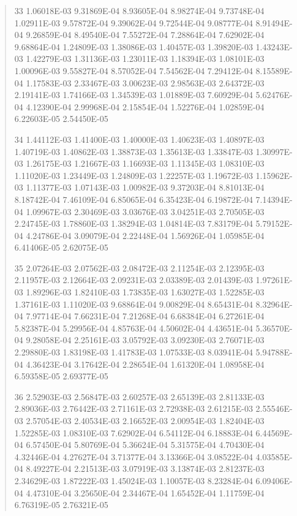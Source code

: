 \documentclass[letterpaper,10pt,english]{sphinxmanual}
\begin{document}
\begin{quote}
\begin{DUlineblock}{0em}
\item[] 33   1.06018E-03  9.31869E-04  8.93605E-04  8.98274E-04  9.73748E-04  1.02911E-03  9.57872E-04  9.39062E-04  9.72544E-04  9.08777E-04  8.91494E-04  9.26859E-04  8.49540E-04  7.55272E-04  7.28864E-04  7.62902E-04  9.68864E-04  1.24809E-03  1.38086E-03  1.40457E-03  1.39820E-03  1.43243E-03  1.42279E-03  1.31136E-03  1.23011E-03  1.18394E-03  1.08101E-03  1.00096E-03  9.55827E-04  8.57052E-04  7.54562E-04  7.29412E-04  8.15589E-04  1.17583E-03  2.33467E-03  3.00623E-03  2.98563E-03  2.64372E-03  2.19141E-03  1.74166E-03  1.34539E-03  1.01889E-03  7.60929E-04  5.62476E-04  4.12390E-04  2.99968E-04  2.15854E-04  1.52276E-04  1.02859E-04  6.22603E-05  2.54450E-05
\item[] 34   1.44112E-03  1.41400E-03  1.40000E-03  1.40623E-03  1.40897E-03  1.40719E-03  1.40862E-03  1.38873E-03  1.35613E-03  1.33847E-03  1.30997E-03  1.26175E-03  1.21667E-03  1.16693E-03  1.11345E-03  1.08310E-03  1.11020E-03  1.23449E-03  1.24809E-03  1.22257E-03  1.19672E-03  1.15962E-03  1.11377E-03  1.07143E-03  1.00982E-03  9.37203E-04  8.81013E-04  8.18742E-04  7.46109E-04  6.85065E-04  6.35423E-04  6.19872E-04  7.14394E-04  1.09967E-03  2.30469E-03  3.03676E-03  3.04251E-03  2.70505E-03  2.24745E-03  1.78860E-03  1.38294E-03  1.04814E-03  7.83179E-04  5.79152E-04  4.24786E-04  3.09079E-04  2.22448E-04  1.56926E-04  1.05985E-04  6.41406E-05  2.62075E-05
\item[] 35   2.07264E-03  2.07562E-03  2.08472E-03  2.11254E-03  2.12395E-03  2.11957E-03  2.12664E-03  2.09231E-03  2.03389E-03  2.01439E-03  1.97261E-03  1.89296E-03  1.82410E-03  1.73835E-03  1.63027E-03  1.52285E-03  1.37161E-03  1.11020E-03  9.68864E-04  9.00829E-04  8.65431E-04  8.32964E-04  7.97714E-04  7.66231E-04  7.21268E-04  6.68384E-04  6.27261E-04  5.82387E-04  5.29956E-04  4.85763E-04  4.50602E-04  4.43651E-04  5.36570E-04  9.28058E-04  2.25161E-03  3.05792E-03  3.09230E-03  2.76071E-03  2.29880E-03  1.83198E-03  1.41783E-03  1.07533E-03  8.03941E-04  5.94788E-04  4.36423E-04  3.17642E-04  2.28654E-04  1.61320E-04  1.08958E-04  6.59358E-05  2.69377E-05
\item[] 36   2.52903E-03  2.56847E-03  2.60257E-03  2.65139E-03  2.81133E-03  2.89036E-03  2.76442E-03  2.71161E-03  2.72938E-03  2.61215E-03  2.55546E-03  2.57054E-03  2.40534E-03  2.16652E-03  2.00954E-03  1.82404E-03  1.52285E-03  1.08310E-03  7.62902E-04  6.54112E-04  6.18883E-04  6.44569E-04  6.57450E-04  5.80769E-04  5.36624E-04  5.31575E-04  4.70430E-04  4.32446E-04  4.27627E-04  3.71377E-04  3.13366E-04  3.08522E-04  4.03585E-04  8.49227E-04  2.21513E-03  3.07919E-03  3.13874E-03  2.81237E-03  2.34629E-03  1.87222E-03  1.45024E-03  1.10057E-03  8.23284E-04  6.09406E-04  4.47310E-04  3.25650E-04  2.34467E-04  1.65452E-04  1.11759E-04  6.76319E-05  2.76321E-05

\end{DUlineblock}
\end{quote}
\end{document}
